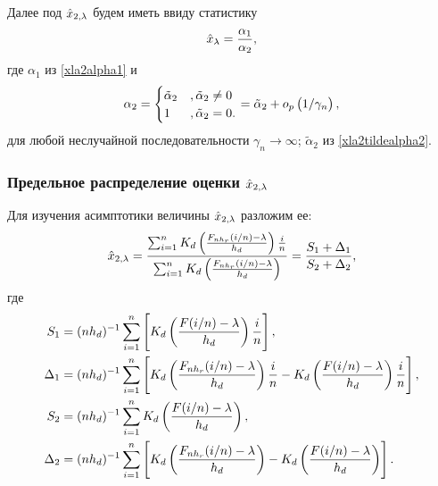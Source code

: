 \documentclass[a4paper,14pt,russian]{article}
\begin{document}
  Далее под $\hat{x}_{2,\lambda}$ будем иметь ввиду статистику
   \begin{equation}
    \hat{x}_\lambda = \frac{\alpha_1}{\alpha_2},
    \label{xla2t}
  \end{equation}
  где $\alpha_1$ из \eqref{xla2alpha1} и
  \begin{equation}
  \alpha_2 =
  \begin{cases}
    \tilde{\alpha}_2 &,  \tilde{\alpha}_2 \neq 0 \\
    1 &, \tilde{\alpha}_2 = 0 .
    \end{cases} =  \tilde{\alpha}_2 + o_p\left(1/\gamma_n\right),
    \label{xla2alpha2}
  \end{equation}
  для любой неслучайной последовательности $\gamma_n \to \infty$; $\tilde{\alpha}_2$ из \eqref{xla2tildealpha2}.

\subsubsection{Предельное распределение оценки $\hat{x}_{2,\lambda}$}
Для изучения асимптотики величины $\hat{x}_{2,\lambda}$ разложим ее:
$$
\hat{x}_{2,\lambda} =  \frac{ \sum_{i=1}^{n} K_d\left(\frac{F_{n h_r}(i/n)-\lambda}{h_d}\right)\frac{i}{n}}{ \sum_{i=1}^{n} K_d\left(\frac{F_{n h_r}(i/n)-\lambda}{h_d}\right)}=\frac{S_1 + \Delta_1}{S_2 + \Delta_2},
$$
где
\begin{align}
S_1 & =  (n h_d)^{-1} \sum_{i=1}^{n} \left[K_d\left(\frac{F(i/n)-\lambda}{h_d}\right)\frac{i}{n}\right],
\label{xla2S1} \\
\Delta_1 & =  (n h_d)^{-1} \sum_{i=1}^{n} \left[K_d\left(\frac{F_{n h_r}(i/n)-\lambda}{h_d}\right)\frac{i}{n}- K_d\left(\frac{F(i/n)-\lambda}{h_d}\right)\frac{i}{n}\right],
\label{xla2delta1}\\
S_2 & =  (n h_d)^{-1} \sum_{i=1}^{n} K_d\left(\frac{F(i/n)-\lambda}{h_d}\right),
\label{xla2S2}\\
\Delta_2 & =  (n h_d)^{-1} \sum_{i=1}^{n} \left[K_d\left(\frac{F_{n h_r}(i/n)-\lambda}{h_d}\right)- K_d\left(\frac{F(i/n)-\lambda}{h_d}\right)\right].
\label{xla2delta2}
\end{align}
\end{document}
